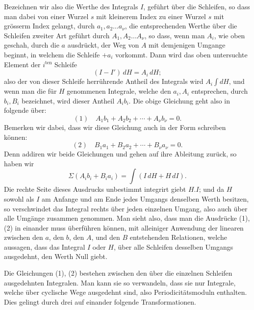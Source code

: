 \documentclass[10pt]{article}
\begin{document}
Bezeichnen wir also die Werthe des Integrals \(I\), geführt über die Schleifen, so dass man dabei von einer Wurzel \(s\) mit kleinerem Index zu einer Wurzel \(s\) mit grösserm Index gelangt, durch \(a_1,a_2\ldots a_{\nu}\), die entsprechenden Werthe über die Schleifen zweiter Art geführt durch \(A_1,A_2\ldots A_{\nu}\), so dass, wenn man \(A_i\), wie oben geschah, durch die \(a\) ausdrückt, der Weg von \(A\) mit demjenigen Umgange beginnt, in welchem die Schleife \(+a_i\) vorkommt. Dann wird das oben untersuchte Element der \(i^{\text{ten}}\) Schleife
\[
(I-I')\,dH=A_i\,dH;
\]
also der von dieser Schleife herrührende Antheil des Integrals wird \(A_i\int dH\), und wenn man die für \(H\) genommenen Integrale, welche den \(a_i,A_i\) entsprechen, durch \(b_i,B_i\) bezeichnet, wird dieser Antheil \(A_i b_i\). Die obige Gleichung geht also in folgende über:
\[
(1)\quad A_1b_1+A_2b_2+\cdots+A_{\nu}b_{\nu}=0.
\]
Bemerken wir dabei, dass wir diese Gleichung auch in der Form schreiben können:
\[
(2)\quad B_1a_1+B_2a_2+\cdots+B_{\nu}a_{\nu}=0.
\]
Denn addiren wir beide Gleichungen und gehen auf ihre Ableitung zurück, so haben wir
\[
\Sigma(A_i b_i+B_i a_i)=\int(I\,dH+H\,dI).
\]
Die rechte Seite dieses Ausdrucks unbestimmt integrirt giebt \(H.I\); und da \(H\) sowohl als \(I\) am Anfange und am Ende jedes Umgangs denselben Werth besitzen, so verschwindet das Integral rechts über jeden einzelnen Umgang, also auch über alle Umgänge zusammen genommen. Man sieht also, dass man die Ausdrücke (1), (2) in einander muss überführen können, mit alleiniger Anwendung der linearen zwischen den \(a\), den \(b\), den \(A\), und den \(B\) entstehenden Relationen, welche aussagen, dass das Integral \(I\) oder \(H\), über alle Schleifen desselben Umgangs ausgedehnt, den Werth Null giebt.

Die Gleichungen (1), (2) bestehen zwischen den über die einzelnen Schleifen ausgedehnten Integralen. Man kann sie so verwandeln, dass sie nur Integrale, welche über cyclische Wege ausgedehnt sind, also Periodicitätsmoduln enthalten. Dies gelingt durch drei auf einander folgende Transformationen.
\end{document}
